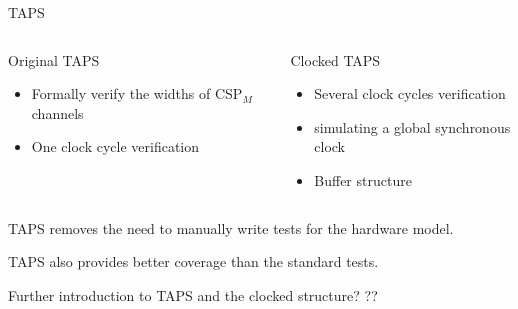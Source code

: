 \documentclass[11pt]{beamer}
\newcommand{\cspm}{CSP$_M$}
\begin{document}
\begin{frame}{TAPS}
    \begin{columns}[t, totalwidth=1.02\textwidth]

        \begin{column}{0.45\linewidth}
            \begin{block}{Original TAPS}
                \begin{itemize}

                    \item Formally verify the widths of \cspm{} channels
                    \item One clock cycle verification
                \end{itemize}
            \end{block}
        \end{column}

        \pause

        \begin{column}{0.45\linewidth}
            \begin{block}{Clocked TAPS}
                \begin{itemize}
                    \item Several clock cycles verification
                    \item simulating a global synchronous clock
                    \item Buffer structure
                \end{itemize}
            \end{block}
        \end{column}

    \end{columns}

\pause

  \begin{block}{}
     TAPS removes the need to manually write tests for the hardware model.
  \end{block}

  \pause

  \begin{block}{}
     TAPS also provides better coverage than the standard tests.
  \end{block}
\end{frame}

\begin{frame}{Further introduction to TAPS and the clocked structure? }
??
\end{frame}
\end{document}
